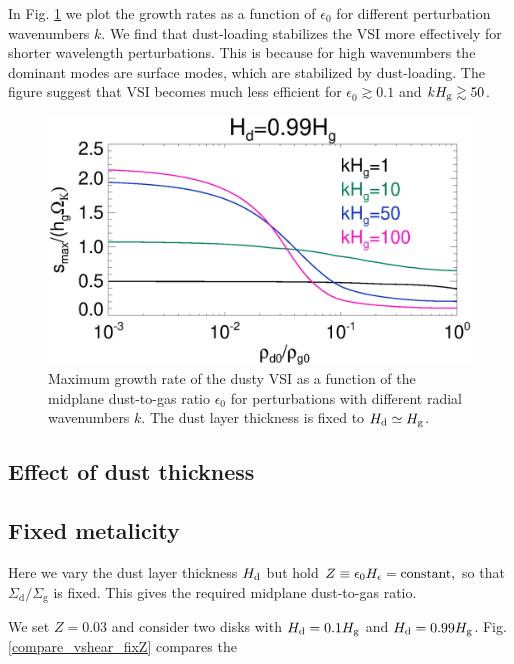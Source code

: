 In Fig. \ref{vsi_dust_loading_vareps} we plot the growth rates as a
function of $\epsilon_0$ for different perturbation wavenumbers $k$. We
find that dust-loading stabilizes the VSI more effectively for shorter
wavelength perturbations. This is because for high wavenumbers the
dominant modes are surface modes, which are stabilized by
dust-loading. The figure suggest that VSI becomes much less efficient
for $\epsilon_0\gtrsim 0.1$ and $kH_\mathrm{g}\gtrsim 50$. 

\begin{figure}
  \includegraphics[width=\linewidth]{figures/compare_eigenvals_vareps} 
  \caption{Maximum growth rate of the dusty VSI as a function of the
    midplane dust-to-gas ratio $\epsilon_0$ for perturbations with
    different radial wavenumbers $k$. The dust layer thickness is
    fixed to $H_\mathrm{d}\simeq H_\mathrm{g}$. 
    \label{vsi_dust_loading_vareps}
    }
\end{figure}

\subsection{Effect of dust thickness}



\subsection{Fixed metalicity} 
Here we vary the dust layer thickness $H_\mathrm{d}$ but hold 
$Z \equiv \epsilon_0 H_\epsilon = \text{constant,}$ 
so that $\Sigma_\mathrm{d}/\Sigma_\mathrm{g}$ is
fixed. This gives the required midplane dust-to-gas ratio.  


We set $Z=0.03$ and consider two disks with $H_\mathrm{d}=0.1H_\mathrm{g}$ and
$H_\mathrm{d}=0.99H_\mathrm{g}$. Fig. \ref{compare_vshear_fixZ} compares the 

